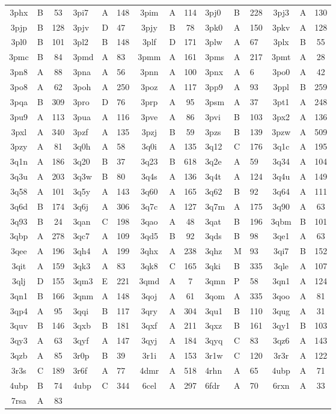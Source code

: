 \begin{longtable}{|c|c|c| a|a|a| c|c|c| a|a|a| c|c|c|}
3phx & B & 53 & 3pi7 & A & 148 & 3pim & A & 114 & 3pj0 & B & 228 & 3pj3 & A & 130\\
3pjp & B & 128 & 3pjv & D & 47 & 3pjy & B & 78 & 3pk0 & A & 150 & 3pkv & A & 128\\
3pl0 & B & 101 & 3pl2 & B & 148 & 3plf & D & 171 & 3plw & A & 67 & 3plx & B & 55\\
3pmc & B & 84 & 3pmd & A & 83 & 3pmm & A & 161 & 3pms & A & 217 & 3pmt & A & 28\\
3pn8 & A & 88 & 3pna & A & 56 & 3pnn & A & 100 & 3pnx & A & 6 & 3po0 & A & 42\\
3po8 & A & 62 & 3poh & A & 250 & 3poz & A & 117 & 3pp9 & A & 93 & 3ppl & B & 259\\
3pqa & B & 309 & 3pro & D & 76 & 3prp & A & 95 & 3psm & A & 37 & 3pt1 & A & 248\\
3pu9 & A & 113 & 3pua & A & 116 & 3pve & A & 86 & 3pvi & B & 103 & 3px2 & A & 136\\
3pxl & A & 340 & 3pzf & A & 135 & 3pzj & B & 59 & 3pzs & B & 139 & 3pzw & A & 509\\
3pzy & A & 81 & 3q0h & A & 58 & 3q0i & A & 135 & 3q12 & C & 176 & 3q1c & A & 195\\
3q1n & A & 186 & 3q20 & B & 37 & 3q23 & B & 618 & 3q2e & A & 59 & 3q34 & A & 104\\
3q3u & A & 203 & 3q3w & B & 80 & 3q4s & A & 136 & 3q4t & A & 124 & 3q4u & A & 149\\
3q58 & A & 101 & 3q5y & A & 143 & 3q60 & A & 165 & 3q62 & B & 92 & 3q64 & A & 111\\
3q6d & B & 174 & 3q6j & A & 306 & 3q7c & A & 127 & 3q7m & A & 175 & 3q90 & A & 63\\
3q93 & B & 24 & 3qan & C & 198 & 3qao & A & 48 & 3qat & B & 196 & 3qbm & B & 101\\
3qbp & A & 278 & 3qc7 & A & 109 & 3qd5 & B & 92 & 3qds & B & 98 & 3qe1 & A & 63\\
3qee & A & 196 & 3qh4 & A & 199 & 3qhx & A & 238 & 3qhz & M & 93 & 3qi7 & B & 152\\
3qit & A & 159 & 3qk3 & A & 83 & 3qk8 & C & 165 & 3qki & B & 335 & 3qle & A & 107\\
3qlj & D & 155 & 3qm3 & E & 221 & 3qmd & A & 7 & 3qmn & P & 58 & 3qn1 & A & 124\\
3qn1 & B & 166 & 3qnm & A & 148 & 3qoj & A & 61 & 3qom & A & 335 & 3qoo & A & 81\\
3qp4 & A & 95 & 3qqi & B & 117 & 3qry & A & 304 & 3qu1 & B & 110 & 3qug & A & 31\\
3quv & B & 146 & 3qxb & B & 181 & 3qxf & A & 211 & 3qxz & B & 161 & 3qy1 & B & 103\\
3qy3 & A & 63 & 3qyf & A & 147 & 3qyj & A & 184 & 3qyq & C & 83 & 3qz6 & A & 143\\
3qzb & A & 85 & 3r0p & B & 39 & 3r1i & A & 153 & 3r1w & C & 120 & 3r3r & A & 122\\
3r3s & C & 189 & 3r6f & A & 77 & 4dmr & A & 518 & 4rhn & A & 65 & 4ubp & A & 71\\
4ubp & B & 74 & 4ubp & C & 344 & 6cel & A & 297 & 6fdr & A & 70 & 6rxn & A & 33\\
7rsa & A & 83 &  &  &  & \\
\bottomrule
\end{longtable}
\fontfamily{\familydefault}
